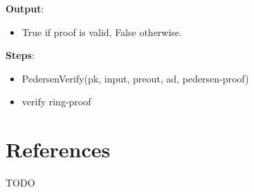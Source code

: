 \documentclass[
]{article}
\providecommand{\tightlist}{%
  \setlength{\itemsep}{0pt}\setlength{\parskip}{0pt}}
\begin{document}
\textbf{Output}:

\begin{itemize}
\tightlist
\item
  True if proof is valid, False otherwise.
\end{itemize}

\textbf{Steps}:

\begin{itemize}
\tightlist
\item
  PedersenVerify(pk, input, preout, ad, pedersen-proof)
\item
  verify ring-proof
\end{itemize}

\hypertarget{references}{%
\section{References}\label{references}}

TODO
\end{document}
